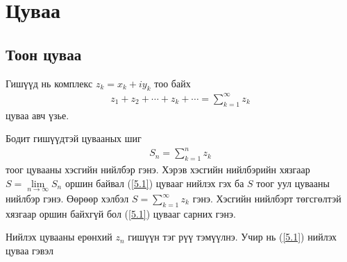 \chapter{Цуваа} 
\section{Тоон цуваа}
Гишүүд нь комплекс $z_k=x_k+iy_k$ тоо байх
\begin{eqnarray} \label{5.1}
   z_1+z_2+\cdots +z_k+\cdots =\sum\limits_{k=1}^\infty z_k
\end{eqnarray}
цуваа авч үзье.

Бодит гишүүдтэй цувааных шиг
\begin{eqnarray}
   S_n=\sum\limits_{k=1}^n z_k
\end{eqnarray}
тоог цувааны хэсгийн нийлбэр гэнэ. Хэрэв хэсгийн нийлбэрийн хязгаар $S=\lim\limits_{n\rightarrow \infty} S_n$ оршин байвал (\ref{5.1}) цувааг нийлэх гэх ба $S$ тоог уул цувааны нийлбэр гэнэ. Өөрөөр хэлбэл $S=\sum\limits_{k=1}^\infty z_k$ гэнэ. Хэсгийн нийлбэрт төгсгөлтэй хязгаар оршин байхгүй бол (\ref{5.1}) цувааг сарних гэнэ.

Нийлэх цувааны ерөнхий $z_n$ гишүүн тэг рүү тэмүүлнэ. Учир нь (\ref{5.1}) нийлэх цуваа гэвэл

